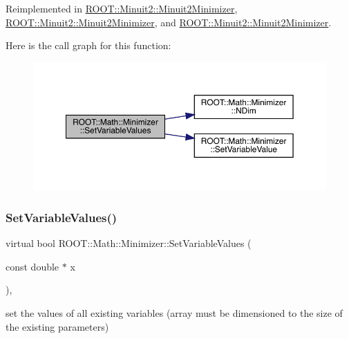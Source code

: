 Reimplemented in \mbox{\hyperlink{classROOT_1_1Minuit2_1_1Minuit2Minimizer_a9511e9711f3d1505556af30046c87d03}{R\+O\+O\+T\+::\+Minuit2\+::\+Minuit2\+Minimizer}}, \mbox{\hyperlink{classROOT_1_1Minuit2_1_1Minuit2Minimizer_a9511e9711f3d1505556af30046c87d03}{R\+O\+O\+T\+::\+Minuit2\+::\+Minuit2\+Minimizer}}, and \mbox{\hyperlink{classROOT_1_1Minuit2_1_1Minuit2Minimizer_a9511e9711f3d1505556af30046c87d03}{R\+O\+O\+T\+::\+Minuit2\+::\+Minuit2\+Minimizer}}.

Here is the call graph for this function\+:
\nopagebreak
\begin{figure}[H]
\begin{center}
\leavevmode
\includegraphics[width=350pt]{dc/dc4/classROOT_1_1Math_1_1Minimizer_ac8368efbd59da8e0b8bc0a0966309609_cgraph}
\end{center}
\end{figure}
\mbox{\label{classROOT_1_1Math_1_1Minimizer_ac8368efbd59da8e0b8bc0a0966309609}} 
\subsubsection{\texorpdfstring{SetVariableValues()}{SetVariableValues()}\hspace{0.1cm}{\footnotesize\ttfamily [3/3]}}
{\footnotesize\ttfamily virtual bool R\+O\+O\+T\+::\+Math\+::\+Minimizer\+::\+Set\+Variable\+Values (\begin{DoxyParamCaption}\item[{const double $\ast$}]{x }\end{DoxyParamCaption})\hspace{0.3cm}{\ttfamily [inline]}, {\ttfamily [virtual]}}



set the values of all existing variables (array must be dimensioned to the size of the existing parameters) 



